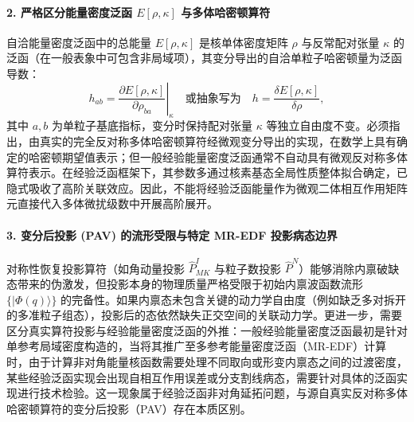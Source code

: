 \paragraph{2. 严格区分能量密度泛函 $E[\rho, \kappa]$ 与多体哈密顿算符}
自洽能量密度泛函中的总能量 $E[\rho, \kappa]$ 是核单体密度矩阵 $\rho$ 与反常配对张量 $\kappa$ 的泛函（在一般表象中可包含非局域项），其变分导出的自洽单粒子哈密顿量为泛函导数：
\begin{equation}\label{eq:2-8-edf-derivative}
h_{ab} = \left. \frac{\partial E[\rho, \kappa]}{\partial \rho_{ba}} \right|_{\kappa} \quad \text{或抽象写为} \quad h = \frac{\delta E[\rho, \kappa]}{\delta \rho} ,
\end{equation}
其中 $a, b$ 为单粒子基底指标，变分时保持配对张量 $\kappa$ 等独立自由度不变。必须指出，由真实的完全反对称多体哈密顿算符经微观变分导出的实现，在数学上具有确定的哈密顿期望值表示；但一般经验能量密度泛函通常不自动具有微观反对称多体算符表示。在经验泛函框架下，其参数多通过核素基态全局性质整体拟合确定，已隐式吸收了高阶关联效应。因此，不能将经验泛函能量作为微观二体相互作用矩阵元直接代入多体微扰级数中开展高阶展开。

\paragraph{3. 变分后投影 (PAV) 的流形受限与特定 MR-EDF 投影病态边界}
对称性恢复投影算符（如角动量投影 $\hat{P}^I_{MK}$ 与粒子数投影 $\hat{P}^N$）能够消除内禀破缺态带来的伪激发，但投影本身的物理质量严格受限于初始内禀波函数流形 $\{|\Phi(q)\rangle\}$ 的完备性。如果内禀态未包含关键的动力学自由度（例如缺乏多对拆开的多准粒子组态），投影后的态依然缺失正交空间的关联动力学。更进一步，需要区分真实算符投影与经验能量密度泛函的外推：一般经验能量密度泛函最初是针对单参考局域密度构造的，当将其推广至多参考能量密度泛函（MR-EDF）计算时，由于计算非对角能量核函数需要处理不同取向或形变内禀态之间的过渡密度，某些经验泛函实现会出现自相互作用误差或分支割线病态，需要针对具体的泛函实现进行技术检验。这一现象属于经验泛函非对角延拓问题，与源自真实反对称多体哈密顿算符的变分后投影（PAV）存在本质区别。

